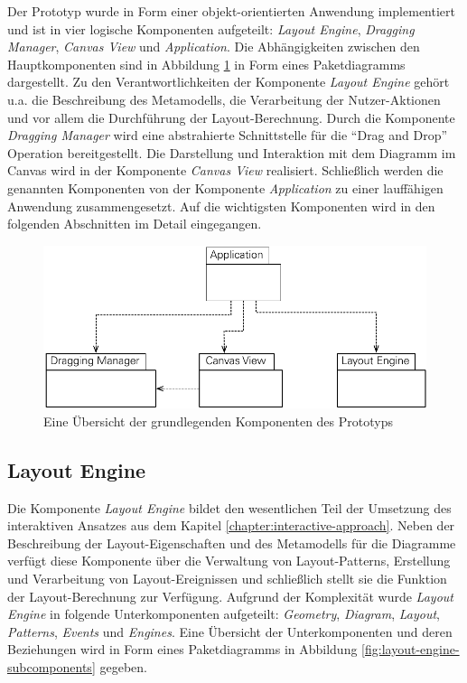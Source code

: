 Der Prototyp wurde in Form einer objekt-orientierten Anwendung implementiert und ist in vier logische Komponenten aufgeteilt: \textit{Layout Engine}, \textit{Dragging Manager}, \textit{Canvas View} und \textit{Application}. Die Abhängigkeiten zwischen den Hauptkomponenten sind in Abbildung \ref{fig:main-components} in Form eines Paketdiagramms dargestellt. Zu den Verantwortlichkeiten der Komponente \textit{Layout Engine} gehört u.a. die Beschreibung des Metamodells, die Verarbeitung der Nutzer-Aktionen und vor allem die Durchführung der Layout-Berechnung. Durch die Komponente \textit{Dragging Manager} wird eine abstrahierte Schnittstelle für die \enquote{Drag and Drop} Operation bereitgestellt. Die Darstellung und Interaktion mit dem Diagramm im Canvas wird in der Komponente \textit{Canvas View} realisiert. Schließlich werden die genannten Komponenten von der Komponente \textit{Application} zu einer lauffähigen Anwendung zusammengesetzt. Auf die wichtigsten Komponenten wird in den folgenden Abschnitten im Detail eingegangen.

\begin{figure}[hbt]
    \centering
    \includegraphics[scale=0.85]{resources/main-components}
    \caption{Eine Übersicht der grundlegenden Komponenten des Prototyps}
    \label{fig:main-components}
\end{figure}

\subsection{Layout Engine}

Die Komponente \textit{Layout Engine} bildet den wesentlichen Teil der Umsetzung des interaktiven Ansatzes aus dem Kapitel \ref{chapter:interactive-approach}. Neben der Beschreibung der Layout-Eigenschaften und des Metamodells für die Diagramme verfügt diese Komponente über die Verwaltung von Layout-Patterns, Erstellung und Verarbeitung von Layout-Ereignissen und schließlich stellt sie die Funktion der Layout-Berechnung zur Verfügung. Aufgrund der Komplexität wurde \textit{Layout Engine} in folgende Unterkomponenten aufgeteilt: \textit{Geometry}, \textit{Diagram}, \textit{Layout}, \textit{Patterns}, \textit{Events} und \textit{Engines}. Eine Übersicht der Unterkomponenten und deren Beziehungen wird in Form eines Paketdiagramms in Abbildung \ref{fig:layout-engine-subcomponents} gegeben.

